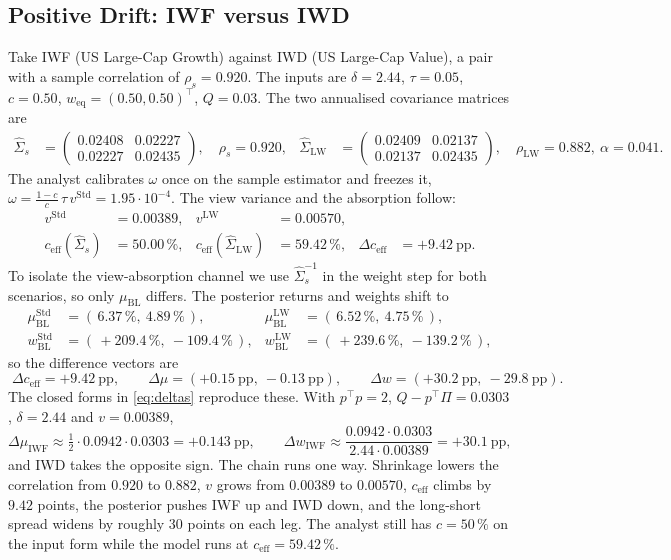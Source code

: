 \documentclass[a4paper,11pt]{article}
\theoremstyle{plain}
\theoremstyle{definition}
\newcommand{\muBL}{\mu_{\mathrm{BL}}}
\newcommand{\Std}{\mathrm{Std}}
\newcommand{\LW}{\mathrm{LW}}
\newcommand{\eff}{\mathrm{eff}}
\begin{document}
\subsection{Positive Drift: IWF versus IWD}
\label{sec:pos}

Take IWF (US Large-Cap Growth) against IWD (US Large-Cap Value), a pair with a
sample correlation of $\rho_s = 0.920$. The inputs are $\delta = 2.44$,
$\tau = 0.05$, $c = 0.50$, $w_{\mathrm{eq}} = (0.50, 0.50)^\top$, $Q = 0.03$. The
two annualised covariance matrices are
\begin{align*}
    \hat\Sigma_s &= \begin{pmatrix} 0.02408 & 0.02227 \\ 0.02227 & 0.02435 \end{pmatrix},
    \quad \rho_s = 0.920, &
    \hat\Sigma_{\LW} &= \begin{pmatrix} 0.02409 & 0.02137 \\ 0.02137 & 0.02435 \end{pmatrix},
    \quad \rho_{\LW} = 0.882,\ \alpha = 0.041 .
\end{align*}
The analyst calibrates $\omega$ once on the sample estimator and freezes it,
$\omega = \tfrac{1-c}{c}\,\tau\,v^\Std = 1.95 \cdot 10^{-4}$. The view variance and
the absorption follow:
\begin{align*}
    v^\Std &= 0.00389, & v^\LW &= 0.00570, \\
    c_{\eff}(\hat\Sigma_s) &= 50.00\,\%, & c_{\eff}(\hat\Sigma_{\LW}) &= 59.42\,\%,
    & \Delta c_{\eff} &= +9.42\ \text{pp} .
\end{align*}
To isolate the view-absorption channel we use $\hat\Sigma_s^{-1}$ in the weight
step for both scenarios, so only $\muBL$ differs. The posterior returns and
weights shift to
\begin{align*}
    \mu_{\mathrm{BL}}^\Std &= (\,6.37\,\%,\ 4.89\,\%\,), & \mu_{\mathrm{BL}}^\LW &= (\,6.52\,\%,\ 4.75\,\%\,), \\
    w_{\mathrm{BL}}^\Std &= (\,+209.4\,\%,\ -109.4\,\%\,), & w_{\mathrm{BL}}^\LW &= (\,+239.6\,\%,\ -139.2\,\%\,),
\end{align*}
so the difference vectors are
\[
    \boxed{\;
    \Delta c_{\eff} = +9.42\ \text{pp}, \qquad
    \Delta\mu = (+0.15\ \text{pp},\ -0.13\ \text{pp}), \qquad
    \Delta w = (+30.2\ \text{pp},\ -29.8\ \text{pp}).
    \;}
\]
The closed forms in \eqref{eq:deltas} reproduce these. With $p^\top p = 2$,
$Q - p^\top\Pi = 0.0303$, $\delta = 2.44$ and $v = 0.00389$,
\[
    \Delta\mu_{\mathrm{IWF}} \approx \tfrac{1}{2}\cdot 0.0942 \cdot 0.0303 = +0.143\ \text{pp},
    \qquad
    \Delta w_{\mathrm{IWF}} \approx \frac{0.0942 \cdot 0.0303}{2.44 \cdot 0.00389} = +30.1\ \text{pp},
\]
and IWD takes the opposite sign. The chain runs one way. Shrinkage lowers the
correlation from $0.920$ to $0.882$, $v$ grows from $0.00389$ to $0.00570$,
$c_{\eff}$ climbs by $9.42$ points, the posterior pushes IWF up and IWD down, and
the long-short spread widens by roughly $30$ points on each leg. The analyst still
has $c = 50\,\%$ on the input form while the model runs at $c_{\eff} = 59.42\,\%$.
\end{document}
